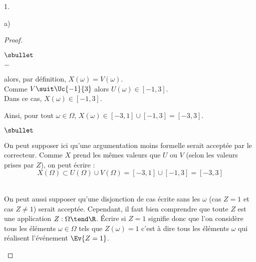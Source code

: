 \begin{noliste}{1.}
\begin{noliste}{a)}
\begin{proof}
\begin{noliste}{$\sbullet$}
\begin{noliste}{$-$}
        \item {} alors, par définition,
          $X(\omega) = V(\omega)$.\\
          Comme $V \suit \Uc{-1}{3}$ alors $U(\omega) \in [-1,3]$.\\[.1cm]
          Dans ce cas, $X(\omega) \in [-1,3]$.
        \end{noliste}
        Ainsi, pour tout $\omega \in \Omega$, $X(\omega) \in [-3,1]
        \cup [-1,3] = [-3,3]$.%
        ~\\[-1.2cm]
      \end{noliste}
      \begin{remark}%
        \begin{noliste}{$\sbullet$}
        \item On peut supposer ici qu'une argumentation moins formelle
          serait acceptée par le correcteur. Comme $X$ prend les mêmes
          valeurs que $U$ ou $V$ (selon les valeurs prises par $Z$),
          on peut écrire :%
          \[
          X(\Omega) \subset U(\Omega) \cup V(\Omega) = [-3, 1] \cup
          [-1, 3] = [-3, 3]
          \]~\\[-1.35cm]
          
        \item On peut aussi supposer qu'une disjonction de cas écrite
          sans les $\omega$ (cas $Z = 1$ et cas $Z \neq 1$) serait
          acceptée. Cependant, il faut bien comprendre que toute \var
          $Z$ est une application $Z : \Omega \tend \R$. Écrire \og si
          $Z = 1$ \fg{} signifie donc que l'on considère tous les
          éléments $\omega \in \Omega$ tels que $Z(\omega) = 1$ c'est
          à dire tous les éléments $\omega$ qui réalisent l'événement
          $\Ev{Z = 1}$.
          

\end{noliste}
\end{remark}
\end{proof}
\end{noliste}
\end{noliste}
